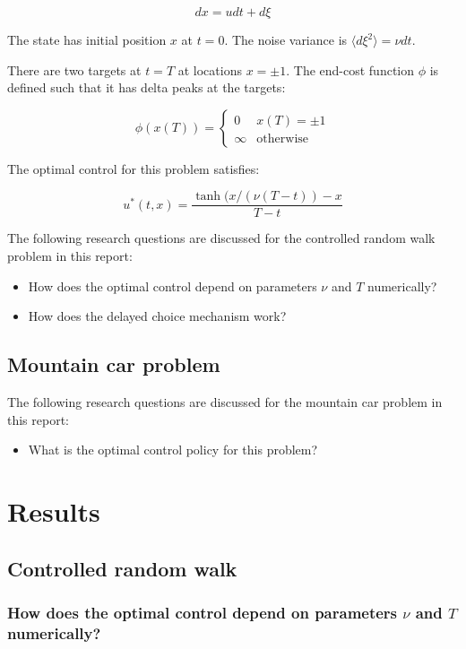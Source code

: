 \documentclass[10pt,a4paper]{article}
\begin{document}
\begin{equation}
dx = u dt + d\xi
\label{eq:crw_dx}
\end{equation}

The state has initial position $x$ at $t = 0$. The noise variance is $\langle d \xi^2 \rangle = \nu dt$.

There are two targets at $t = T$ at locations $x = \pm 1$. The end-cost function $\phi$ is defined such that it has delta peaks at the targets:

\begin{equation}
\phi(x(T)) = \begin{cases}
0 & x(T) = \pm 1\\
\infty & \mbox{otherwise}
\end{cases}
\label{eq:crw_phi}
\end{equation}

The optimal control for this problem satisfies:

\begin{equation}
u^{*}(t, x) = \frac{\tanh(x / (\nu (T - t)) - x}{T - t}
\label{eq:crw_u}
\end{equation}

The following research questions are discussed for the controlled random walk problem in this report:
\begin{itemize}
\item How does the optimal control depend on parameters $\nu$ and $T$ numerically?
\item How does the delayed choice mechanism work?
\end{itemize}

\subsection{Mountain car problem}
The following research questions are discussed for the mountain car problem in this report:
\begin{itemize}
\item What is the optimal control policy for this problem?
\end{itemize}

\section{Results}
\subsection{Controlled random walk}
\subsubsection{How does the optimal control depend on parameters $\nu$ and $T$ numerically?}
\end{document}

